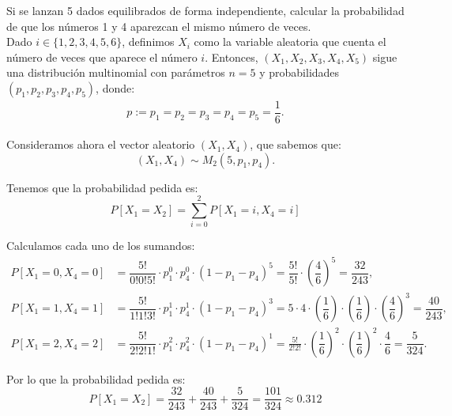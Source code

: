 \begin{ejercicio}
    Si se lanzan 5 dados equilibrados de forma independiente, calcular la probabilidad de que los números 1 y 4 aparezcan el mismo número de veces.\\

    Dado $i\in \{1,2,3,4,5,6\}$, definimos $X_i$ como la variable aleatoria que cuenta el número de veces que aparece el número $i$. Entonces, $(X_1,X_2,X_3,X_4,X_5)$ sigue una distribución multinomial con parámetros $n = 5$ y probabilidades $(p_1,p_2,p_3,p_4,p_5)$, donde:
    \begin{gather*}
        p := p_1 = p_2 = p_3 = p_4 = p_5 = \dfrac{1}{6}.
    \end{gather*}

    Consideramos ahora el vector aleatorio $(X_1,X_4)$, que sabemos que:
    \begin{equation*}
        (X_1,X_4) \sim M_2\left(5,p_1,p_4\right).
    \end{equation*}

    Tenemos que la probabilidad pedida es:
    \begin{equation*}
        P[X_1=X_2]=\sum_{i=0}^2 P[X_1 = i,X_4 = i]
    \end{equation*}

    Calculamos cada uno de los sumandos:
    \begin{align*}
        P[X_1 = 0,X_4 = 0] &= \dfrac{5!}{0!0!5!}\cdot p_1^0 \cdot p_4^0 \cdot (1-p_1-p_4)^5 = \dfrac{5!}{5!} \cdot \left(\dfrac{4}{6}\right)^5 = \dfrac{32}{243},\\
        P[X_1 = 1,X_4 = 1] &= \dfrac{5!}{1!1!3!}\cdot p_1^1 \cdot p_4^1 \cdot (1-p_1-p_4)^3 = 5\cdot 4\cdot \left(\dfrac{1}{6}\right)\cdot \left(\dfrac{1}{6}\right)\cdot \left(\dfrac{4}{6}\right)^3 = \dfrac{40}{243},\\
        P[X_1 = 2,X_4 = 2] &= \dfrac{5!}{2!2!1!}\cdot p_1^2 \cdot p_4^2 \cdot (1-p_1-p_4)^1 = \frac{5!}{2!2!} \cdot \left(\dfrac{1}{6}\right)^2 \cdot \left(\dfrac{1}{6}\right)^2 \cdot \dfrac{4}{6} = \dfrac{5}{324}.
    \end{align*}

    Por lo que la probabilidad pedida es:
    \begin{equation*}
        P[X_1=X_2]=\dfrac{32}{243} + \dfrac{40}{243} + \dfrac{5}{324} = \dfrac{101}{324} \approx 0.312
    \end{equation*}
\end{ejercicio}

